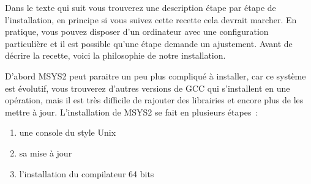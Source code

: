 \documentclass{article}
\begin{document}
Dans le texte qui suit vous trouverez une description étape par étape de l'installation, en principe si vous suivez cette recette cela devrait marcher. En pratique, vous pouvez disposer d'un ordinateur avec une configuration particulière et il est possible qu'une étape demande un ajustement. Avant de décrire la recette, voici la philosophie de notre installation. 

D'abord MSYS2 peut paraitre un peu plus compliqué à installer, car ce système est évolutif, vous trouverez d'autres versions de GCC qui s'installent en une opération, mais il est très difficile de rajouter des librairies et encore plus de les mettre à jour. L'installation de MSYS2 se fait en plusieurs étapes :
\begin{enumerate}
\item une console du style Unix
\item sa mise à jour
\item l'installation du compilateur 64 bits
\end{enumerate}
 
\end{document}
